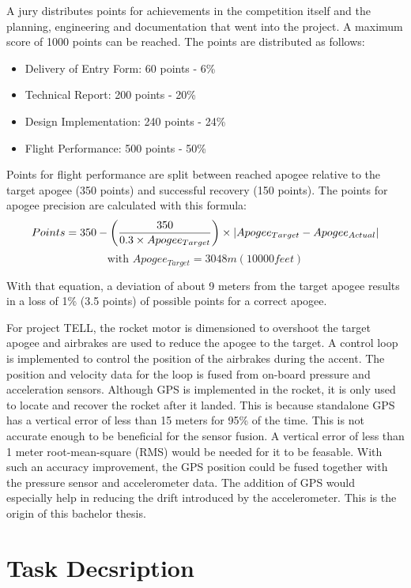 \vspace{0.5cm}

A jury distributes points for achievements in the competition itself and the planning, engineering and documentation that went into the project.
A maximum score of 1000 points can be reached.
The points are distributed as follows:
\begin{itemize}
 \item Delivery of Entry Form: 60 points - 6\%
 \item Technical Report: 200 points - 20\%
 \item Design Implementation: 240 points - 24\%
 \item Flight Performance: 500 points - 50\%
\end{itemize}

Points for flight performance are split between reached apogee relative to the target apogee (350 points) and successful recovery (150 points).
The points for apogee precision are calculated with this formula:
$$ Points = 350 - \left( \frac{350}{0.3 \times Apogee_{Target}} \right) \times \abs{Apogee_{Target} - Apogee_{Actual}} $$
$$ \text{with } Apogee_{Target} = 3048m(10000feet)$$ 

With that equation, a deviation of about 9 meters from the target apogee results in a loss of 1\% (3.5 points) of possible points for a correct apogee. \cite{sac_rules2017}

For project TELL, the rocket motor is dimensioned to overshoot the target apogee and airbrakes are used to reduce the apogee to the target.
A control loop is implemented to control the position of the airbrakes during the accent.
The position and velocity data for the loop is fused from on-board pressure and acceleration sensors.
Although GPS is implemented in the rocket, it is only used to locate and recover the rocket after it landed.
This is because standalone GPS has a vertical error of less than 15 meters for 95\% of the time. \cite{SPS_Performance}
This is not accurate enough to be beneficial for the sensor fusion.
A vertical error of less than 1 meter root-mean-square (RMS) would be needed for it to be feasable.
With such an accuracy improvement, the GPS position could be fused together with the pressure sensor and accelerometer data.
The addition of GPS would especially help in reducing the drift introduced by the accelerometer.
This is the origin of this bachelor thesis.


\section{Task Decsription}


